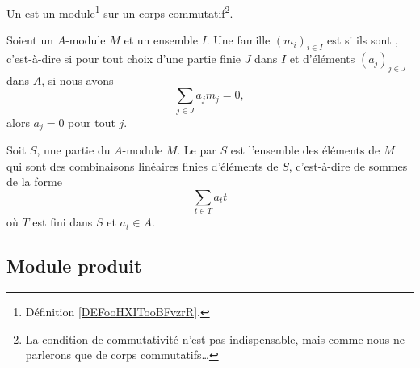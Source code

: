 \begin{definition}\label{DEFooKHWZooIfxdNc}
    Un  est un module\footnote{Définition \ref{DEFooHXITooBFvzrR}.} sur un corps commutatif\footnote{La condition de commutativité n'est pas indispensable, mais comme nous ne parlerons que de corps commutatifs\ldots}.
\end{definition}

\begin{definition}        \label{DEFooRUKVooLnXxdS}
    Soient un \( A\)-module \( M\) et un ensemble \( I\). Une famille \( (m_i)_{i\in I}\) est  si ils sont , c'est-à-dire si pour tout choix d'une partie finie \( J\) dans \( I\) et d'éléments \( (a_j)_{j\in J}\) dans \( A\), si nous avons
    \begin{equation}
        \sum_{j\in J}a_jm_j=0,
    \end{equation}
    alors \( a_j=0\) pour tout \( j\).
\end{definition}

\begin{definition}        \label{DEFooWBOBooJNyyBF}
    Soit \( S\), une partie du \( A\)-module \( M\). Le  par \( S\) est l'ensemble des éléments de \( M\) qui sont des combinaisons linéaires finies d'éléments de \( S\), c'est-à-dire de sommes de la forme
    \begin{equation}
        \sum_{t\in T}a_tt
    \end{equation}
    où \( T\) est fini dans \( S\) et \( a_t\in A\).
\end{definition}

\subsection{Module produit}

